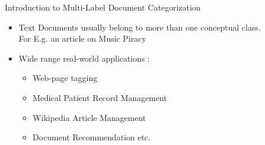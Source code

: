 \documentclass[10pt]{beamer}
\begin{document}
\begin{frame}{Introduction to Multi-Label Document Categorization}
\vfill{}
\vfill
{}
\begin{itemize}
	\vfill\item<3-> Text Documents usually belong to more than one conceptual class. \\For E.g. an article on Music Piracy 
	\vfill\item<4-> Wide range real-world applications :
	\begin{itemize} 
	  \vfill\item<4-> Web-page tagging
	  \vfill\item<4-> Medical Patient Record Management
	  \vfill\item<4-> Wikipedia Article Management
	  \vfill\item<4-> Document Recommendation etc.
	\end{itemize} 
\end{itemize}
\vfill
\end{frame}

\end{document}
